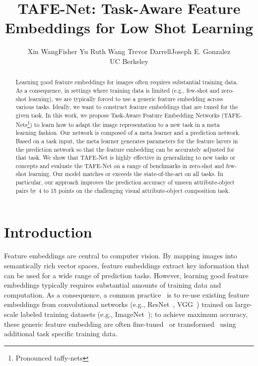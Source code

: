 \documentclass[10pt,twocolumn,letterpaper]{article}
\title{TAFE-Net: Task-Aware Feature Embeddings for Low Shot Learning}
\author{
	Xin Wang\quad Fisher Yu\quad 
	Ruth Wang\quad 
	Trevor Darrell\quad Joseph E. Gonzalez \\
	{UC Berkeley}
}
\newcommand{\model}{TAFE-Net\xspace}
\newcommand{\modelplural}{TAFE-Nets\xspace}
\begin{document}
	\maketitle
	
	\begin{abstract}
		Learning good feature embeddings for images often requires substantial training data.
		As a consequence, in settings where training data is limited (e.g., few-shot and zero-shot learning), we are typically forced to use a generic feature embedding across various
		 tasks. Ideally, we want to construct feature embeddings that are tuned for the given task.
		In this work, we propose Task-Aware Feature Embedding Networks (\modelplural\footnote{Pronounced taffy-nets}) to learn how to adapt the image representation to a new task in a meta learning fashion. 
		Our network is composed of a meta learner and a prediction network. Based on a task input, the meta learner generates parameters for the feature layers in the prediction network so that the feature embedding can be accurately adjusted
		for that task.
		We show that \model is highly effective in generalizing to new tasks or concepts and evaluate the \model
		on a range of benchmarks in zero-shot and few-shot learning.
Our model matches or exceeds the state-of-the-art on all tasks. In particular, our approach improves the
		prediction accuracy of unseen attribute-object pairs by 4 to 15 points on the challenging visual 
		attribute-object composition task.
	\end{abstract}
	
	\section{Introduction}
Feature embeddings are central to 
computer vision.
By mapping images into semantically rich vector spaces, feature embeddings extract key information that can be used for a wide range of prediction tasks.  
However, learning good feature embeddings typically requires substantial amounts of training data and computation.  
As a consequence, a common practice~\cite{donahue2014decaf,girshick2014rich,zeiler2014visualizing} is to re-use existing feature embeddings from convolutional networks (e.g., ResNet~\cite{he2016deep}, VGG~\cite{simonyan2014very}) trained on large-scale labeled training datasets (e.g., ImageNet~\cite{russakovsky2015imagenet}); to achieve maximum accuracy, these generic feature embedding are often fine-tuned~\cite{donahue2014decaf,girshick2014rich,zeiler2014visualizing} or transformed~\cite{Hoffman_cycada2017} using additional task specific training data. 
\end{document}
